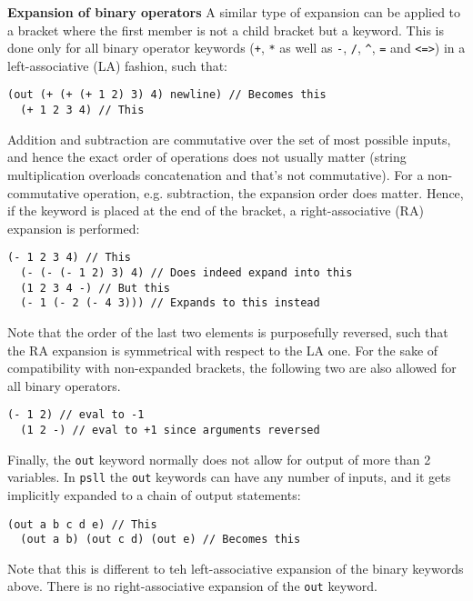 \documentclass[aip,jcp,reprint,footinbib]{revtex4-1}
\let\tt\texttt
\newcommand\psll{\texttt{psll}\xspace}
\begin{document}
\textbf{Expansion of binary operators} A similar type of expansion can be applied to a bracket where the first member is not a child bracket but a keyword. This is done only for all binary operator keywords (\tt{+}, \tt{*} as well as \tt{-}, \tt{/}, \tt{\^}, \tt{=} and \tt{<=>}) in a left-associative (LA) fashion, such that:
\begin{lstlisting}[language=psll,aboveskip=3pt,belowskip=-2pt,frame=none,numbers=none]
  (out (+ (+ (+ 1 2) 3) 4) newline) // Becomes this
  (+ 1 2 3 4) // This
\end{lstlisting}
Addition and subtraction are commutative over the set of most possible inputs, and hence the exact order of operations does not usually matter (string multiplication overloads concatenation and that's not commutative). For a non-commutative operation, e.g. subtraction, the expansion order does matter. Hence, if the keyword is placed at the end of the bracket, a right-associative (RA) expansion is performed:
\begin{lstlisting}[language=psll,aboveskip=3pt,belowskip=-2pt,frame=none,numbers=none]
  (- 1 2 3 4) // This
  (- (- (- 1 2) 3) 4) // Does indeed expand into this
  (1 2 3 4 -) // But this
  (- 1 (- 2 (- 4 3))) // Expands to this instead
\end{lstlisting}
Note that the order of the last two elements is purposefully reversed, such that the RA expansion is symmetrical with respect to the LA one. For the sake of compatibility with non-expanded brackets, the following two are also allowed for all binary operators.
\begin{lstlisting}[language=psll,aboveskip=3pt,belowskip=-2pt,frame=none,numbers=none]
  (- 1 2) // eval to -1
  (1 2 -) // eval to +1 since arguments reversed
\end{lstlisting}

Finally, the \tt{out} keyword normally does not allow for output of more than 2 variables. In \psll the \tt{out} keywords can have any number of inputs, and it gets implicitly expanded to a chain of output statements: 
\begin{lstlisting}[language=psll,aboveskip=3pt,belowskip=-2pt,frame=none,numbers=none]
  (out a b c d e) // This
  (out a b) (out c d) (out e) // Becomes this
\end{lstlisting}
Note that this is different to teh left-associative expansion of the binary keywords above. There is no right-associative expansion of the \tt{out} keyword.
\end{document}
